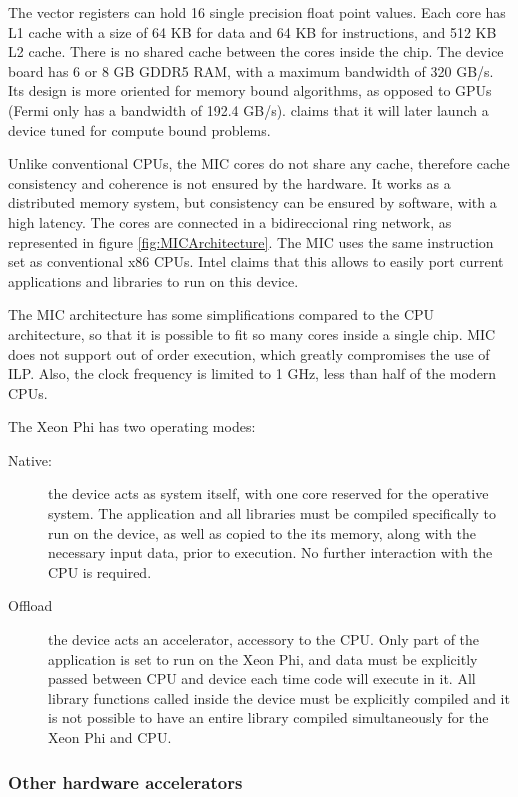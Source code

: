 The vector registers can hold 16 single precision float point values. Each core has L1 cache with a size of 64 KB for data and 64 KB for instructions, and 512 KB L2 cache. There is no shared cache between the cores inside the chip. The device board has 6 or 8 GB GDDR5 RAM, with a maximum bandwidth of 320 GB/s. Its design is more oriented for memory bound algorithms, as opposed to GPUs (Fermi only has a bandwidth of 192.4 GB/s). \intel claims that it will later launch a device tuned for compute bound problems.

Unlike conventional CPUs, the MIC cores do not share any cache, therefore cache consistency and coherence is not ensured by the hardware. It works as a distributed memory system, but consistency can be ensured by software, with a high latency. The cores are connected in a bidireccional ring network, as represented in figure \ref{fig:MICArchitecture}. The MIC uses the same instruction set as conventional x86 CPUs. Intel claims that this allows to easily port current applications and libraries to run on this device.

The MIC architecture has some simplifications compared to the CPU architecture, so that it is possible to fit so many cores inside a single chip. MIC does not support out of order execution, which greatly compromises the use of ILP. Also, the clock frequency is limited to 1 GHz, less than half of the modern CPUs.

The Xeon Phi has two operating modes:

\begin{description}
	\item[Native:] the device acts as system itself, with one core reserved for the operative system. The application and all libraries must be compiled specifically to run on the device, as well as copied to the its memory, along with the necessary input data, prior to execution. No further interaction with the CPU is required.
	\item[Offload] the device acts an accelerator, accessory to the CPU. Only part of the application is set to run on the Xeon Phi, and data must be explicitly passed between CPU and device each time code will execute in it. All library functions called inside the device must be explicitly compiled and it is not possible to have an entire library compiled simultaneously for the Xeon Phi and CPU.
\end{description}

\subsubsection*{Other hardware accelerators}
\label{OtherAccelerators}

